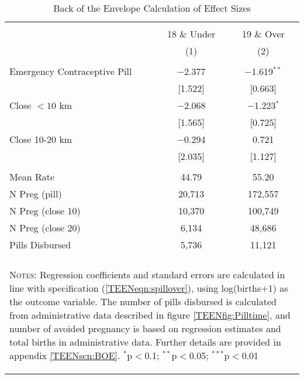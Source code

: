 \begin{table}[!htbp] \centering
\caption{Back of the Envelope Calculation of Effect Sizes}
\label{TEENtab:BOE}
\begin{tabular}{@{\extracolsep{5pt}}lcc}
\\[-1.8ex]\hline \hline \\[-1.8ex] 
& 18 \& Under & 19 \& Over\\ 
&(1)&(2) \\ \hline
 & &  \\
Emergency Contraceptive Pill &$-$2.377&$-$1.619$^{**}$\\
&[1.522]&[0.663]\\
Close $<10$ km &$-$2.068&$-$1.223$^{*}$\\
&[1.565]&[0.725]\\
Close 10-20 km &$-$0.294& 0.721\\
&[2.035]&[1.127]\\
& & \\ \midrule
Mean Rate &44.79&55.20\\
N Preg (pill) &20,713&172,557\\
N Preg (close 10)&10,370&100,749\\
N Preg (close 20)&6,134&48,686\\
Pills Disbursed & 5,736 & 11,121 \\
\hline \hline \\[-1.8ex]
\multicolumn{3}{p{10cm}}{\begin{footnotesize} 
\textsc{Notes:} Regression coefficients and standard 
errors are calculated in line with specification 
(\ref{TEENeqn:spillover}), using log(births+1) as the 
outcome variable. The number of pills disbursed 
is calculated from administrative data described in 
figure \ref{TEENfig:Pilltime}, and number of avoided 
pregnancy is based on regression estimates and total births
in administrative data. Further details are provided in 
appendix \ref{TEENscn:BOE}.
$^{*}$p$<$0.1; $^{**}$p$<$0.05; $^{***}$p$<$0.01\end{footnotesize}}
\normalsize\end{tabular}\end{table}
